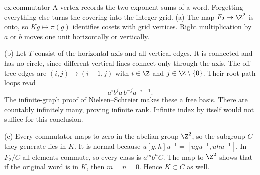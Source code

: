 \begin{solution}{ex:commutator}
\idea A vertex records the two exponent sums of a word. Forgetting everything else turns the covering into the integer grid.
\writeup (a) The map $F_2\to\Z^2$ is onto, so $Kg\mapsto\pi(g)$ identifies cosets with grid vertices. Right multiplication by $a$ or $b$ moves one unit horizontally or vertically.

(b) Let $T$ consist of the horizontal axis and all vertical edges. It is connected and has no circle, since different vertical lines connect only through the axis. The off-tree edges are $(i,j)\to(i+1,j)$ with $i\in\Z$ and $j\in\Z\setminus\{0\}$. Their root-path loops read
\[
a^ib^ja\,b^{-j}a^{-i-1}.
\]
The infinite-graph proof of Nielsen--Schreier makes these a free basis. There are countably infinitely many, proving infinite rank. Infinite index by itself would not suffice for this conclusion.

(c) Every commutator maps to zero in the abelian group $\Z^2$, so the subgroup $C$ they generate lies in $K$. It is normal because $u[g,h]u^{-1}=[ugu^{-1},uhu^{-1}]$. In $F_2/C$ all elements commute, so every class is $a^mb^nC$. The map to $\Z^2$ shows that if the original word is in $K$, then $m=n=0$. Hence $K\subset C$ as well.
\end{solution}

